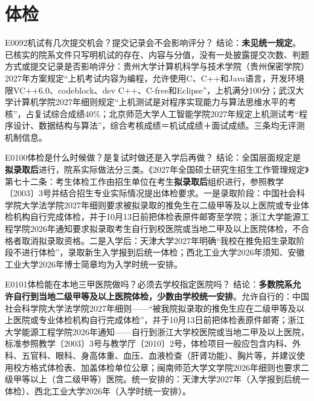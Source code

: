 \section{体检}
\begin{qa}{E0092}{机试有几次提交机会？提交记录会不会影响评分？}
结论：\textbf{未见统一规定}。已核实的院系文件只写明机试的存在、内容与分值，没有一处披露提交次数、判题方式或提交记录是否影响评分：贵州大学计算机科学与技术学院（贵州保密学院）2027年方案规定“上机考试内容为编程，允许使用C、C++和Java语言，开发环境限VC++6.0、codeblock、dev C++、C-free和Eclipse”，上机满分100分；武汉大学计算机学院2027年细则规定“上机测试是对程序实现能力与算法思维水平的考核”，占复试综合成绩40\%；北京师范大学人工智能学院2027年规定上机测试考“程序设计、数据结构与算法”，综合考核成绩＝机试成绩＋面试成绩。三条均无评测机制信息。
\end{qa}

\begin{qa}{E0100}{体检是什么时候做？是复试时做还是入学后再做？}
结论：全国层面规定是\textbf{拟录取后}进行，院系实际做法分三类。《2027年全国硕士研究生招生工作管理规定》第七十二条：考生体检工作由招生单位在考生\textbf{拟录取后}组织进行，参照教学〔2003〕3号并结合招生专业实际情况提出体检要求。一是录取阶段：中国社会科学院大学法学院2027年细则要求被拟录取的推免生在二级甲等及以上医院或专业体检机构自行完成体检，并于10月13日前把体检表原件邮寄至学院；浙江大学能源工程学院2026年通知要求拟录取考生自行到校医院或当地二甲及以上医院体检，不合格者取消拟录取资格。二是入学后：天津大学2027年明确“我校在推免招生录取阶段不进行体检”，录取新生入学报到后统一体检；西北工业大学2026年须知、安徽工业大学2026年博士简章均为入学时统一安排。
\end{qa}

\begin{qa}{E0101}{体检能在本地三甲医院做吗？必须去学校指定医院吗？}
结论：\textbf{多数院系允许自行到当地二级甲等及以上医院体检，少数由学校统一安排}。允许自行的：中国社会科学院大学法学院2027年细则——“被我院拟录取的推免生应在二级甲等及以上医院或专业体检机构自行完成体检”，并于10月13日前把体检表原件邮寄；浙江大学能源工程学院2026年通知——自行到浙江大学校医院或当地二甲及以上医院，标准参照教学〔2003〕3号与教学厅〔2010〕2号，体检项目一般应包含内科、外科、五官科、眼科、身高体重、血压、血液检查（肝肾功能）、胸片等，并建议使用校方格式体检表、加盖体检单位公章；闽南师范大学文学院2026年细则也要求二级甲等以上（含二级甲等）医院。统一安排的：天津大学2027年（入学报到后统一体检）、西北工业大学2026年（入学时统一安排）。
\end{qa}

